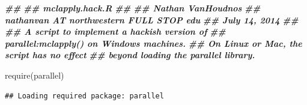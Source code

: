\documentclass[
  12pt,
  american,
  a4paper,
  extrafontsizes,onecolumn,openright
  ]{memoir}
\newenvironment{Shaded}{\begin{snugshade}}{\end{snugshade}}
\newcommand{\DocumentationTok}[1]{\textcolor[rgb]{0.56,0.35,0.01}{\textbf{\textit{#1}}}}
\newcommand{\FunctionTok}[1]{\textcolor[rgb]{0.00,0.00,0.00}{#1}}
\newcommand{\NormalTok}[1]{#1}
\begin{document}
\scriptsize

\begin{Shaded}
\begin{Highlighting}[]
\DocumentationTok{\#\#}
\DocumentationTok{\#\# mclapply.hack.R}
\DocumentationTok{\#\#}
\DocumentationTok{\#\# Nathan VanHoudnos}
\DocumentationTok{\#\# nathanvan AT northwestern FULL STOP edu}
\DocumentationTok{\#\# July 14, 2014}
\DocumentationTok{\#\#}
\DocumentationTok{\#\# A script to implement a hackish version of }
\DocumentationTok{\#\# parallel:mclapply() on Windows machines.}
\DocumentationTok{\#\# On Linux or Mac, the script has no effect}
\DocumentationTok{\#\# beyond loading the parallel library. }

\FunctionTok{require}\NormalTok{(parallel)    }
\end{Highlighting}
\end{Shaded}

\begin{verbatim}
## Loading required package: parallel
\end{verbatim}
\end{document}
